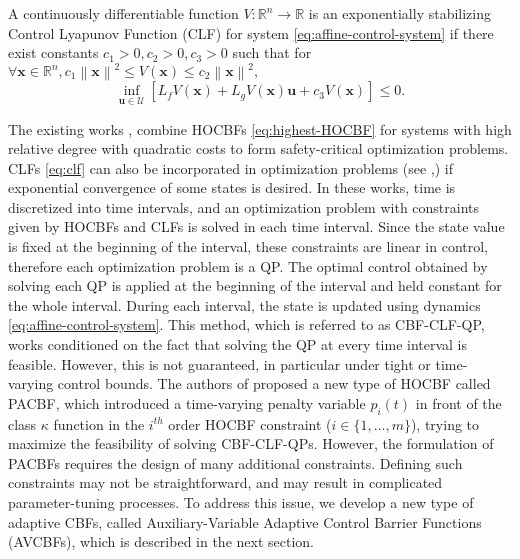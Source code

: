 \begin{definition}
\label{def:control-l-f}
A continuously differentiable function $V:\mathbb{R}^{n}\to\mathbb{R}$ is an exponentially stabilizing Control Lyapunov Function (CLF) for system \eqref{eq:affine-control-system} if there exist constants $c_{1}>0, c_{2}>0,c_{3}>0$ such that for $\forall \boldsymbol{x} \in \mathbb{R}^{n}, c_{1}\left \|  \boldsymbol{x} \right \| ^{2} \le V(\boldsymbol{x}) \le c_{2}\left \|  \boldsymbol{x} \right \| ^{2},$
\begin{equation}
\label{eq:clf}
\inf_{\boldsymbol{u}\in \mathcal U}[L_{f}V(\boldsymbol{x})+L_{g}V(\boldsymbol{x})\boldsymbol{u}+c_{3}V(\boldsymbol{x})]\le 0.
\end{equation}
\end{definition}

The existing works \cite{nguyen2016exponential},\cite{xiao2021high} combine HOCBFs \eqref{eq:highest-HOCBF} for systems with high relative degree with quadratic costs to form safety-critical optimization problems.
CLFs \eqref{eq:clf} can also be incorporated in optimization problems (see \cite{xiao2022sufficient},\cite{xiao2021adaptive}) if exponential convergence of some states is desired. In these works, time is discretized into time intervals,
and an optimization problem with constraints
given by HOCBFs and CLFs is solved in each
time interval. Since the state value is fixed
at the beginning of the interval, these
constraints are linear in control, therefore each optimization problem is a QP. The optimal control obtained by solving each QP is applied at the beginning of the interval and held constant for the
whole interval. During each interval, the state is updated using dynamics \eqref{eq:affine-control-system}. This method, which is referred to as CBF-CLF-QP, works conditioned on the fact that solving the QP at every time interval is feasible. However, this is not guaranteed, in particular
under tight or time-varying control bounds. 
 The authors of \cite{xiao2021adaptive} proposed a new type of HOCBF called PACBF, which introduced a time-varying penalty variable $p_{i}(t)$ in front of the class $\kappa$ function in the $i^{th}$ order HOCBF constraint ($i\in \{1,\dots,m\}$), trying to maximize the feasibility of solving CBF-CLF-QPs. However, the formulation of PACBFs requires the design of many additional constraints. Defining such constraints may not be straightforward, and may result in complicated parameter-tuning processes. To address this issue, we develop a new type of adaptive CBFs, called Auxiliary-Variable Adaptive Control Barrier Functions (AVCBFs), which is described in the next section.


